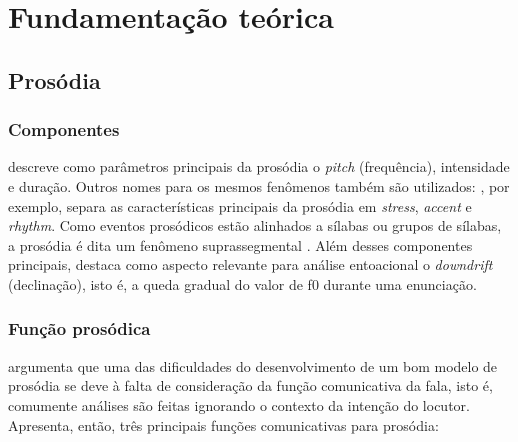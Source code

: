 
\chapter{Fundamentação teórica}

\section{Prosódia}
\subsection{Componentes}
 descreve como parâmetros principais da prosódia o
\emph{pitch} (frequência), intensidade e duração. Outros nomes para os mesmos
fenômenos também são utilizados: , por exemplo, separa as
características principais da prosódia em \emph{stress}, \emph{accent} e
\emph{rhythm}. Como eventos prosódicos estão alinhados a sílabas ou grupos de
sílabas, a prosódia é dita um fenômeno suprassegmental \cite{ladd}. Além desses
componentes principais,  destaca como aspecto relevante
para análise entoacional o \emph{downdrift} (declinação), isto é, a queda
gradual do valor de f0 durante uma enunciação.


\subsection{Função prosódica}
 argumenta que uma das dificuldades do desenvolvimento de
um bom modelo de prosódia se deve à falta de consideração da função
comunicativa da fala, isto é, comumente análises são feitas ignorando o contexto
da intenção do locutor. Apresenta, então, três principais funções comunicativas
para prosódia:

